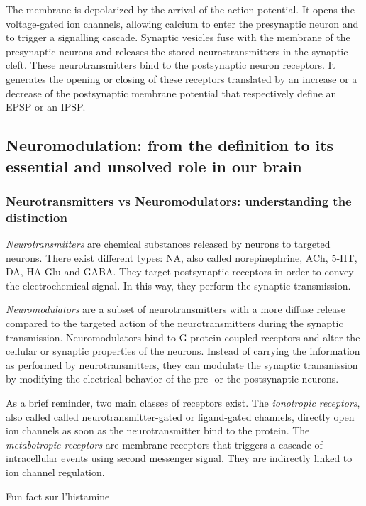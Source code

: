 The membrane is depolarized by the arrival of the action potential. It opens the voltage-gated ion channels, allowing calcium to enter the presynaptic neuron and to trigger a signalling cascade. Synaptic vesicles  fuse with the membrane of the presynaptic neurons and releases the stored neurostransmitters in the synaptic cleft. These neurotransmitters bind to the postsynaptic neuron receptors. It generates the opening or closing of these receptors translated by an increase or a decrease of the postsynaptic membrane potential that respectively define an \acrfull{EPSP} or an \acrfull{IPSP}. 


\subsection{Neuromodulation: from the definition to its essential and unsolved role in our brain}
\subsubsection{Neurotransmitters vs Neuromodulators: understanding the distinction}
\textit{Neurotransmitters} are chemical substances released by neurons to targeted neurons. There exist different types: \acrfull{NA}, also called norepinephrine, \acrfull{ACh}, \acrfull{5-HT}, \acrfull{DA}, \acrfull{HA} \acrfull{Glu} and \acrfull{GABA}. They target postsynaptic receptors in order to convey the electrochemical signal. In this way, they perform the synaptic transmission.

\textit{Neuromodulators} are a subset of neurotransmitters with a more diffuse release compared to the targeted action of the neurotransmitters during the synaptic transmission. Neuromodulators bind to G protein-coupled receptors and alter the cellular or synaptic properties of the neurons. Instead of carrying the information as performed by neurotransmitters, they can modulate the synaptic transmission by modifying the electrical behavior of the pre- or the postsynaptic neurons. 


\smallbreak
\noindent
\begin{minipage}{0.45\textwidth}
As a brief reminder, two main classes of receptors exist\citep{purves_neuroscience_nodate}. The \textit{ionotropic receptors}, also called called neurotransmitter-gated or ligand-gated channels,  directly open ion channels as soon as the neurotransmitter bind to the protein. The  \textit{metabotropic receptors} are membrane receptors that triggers a cascade of intracellular events using second messenger signal. They are indirectly linked to ion channel regulation.
\end{minipage}
\hfill
\begin{minipage}{0.45\textwidth}
    \begin{shaded}
        Fun fact sur l'histamine
    \end{shaded}
\end{minipage}


